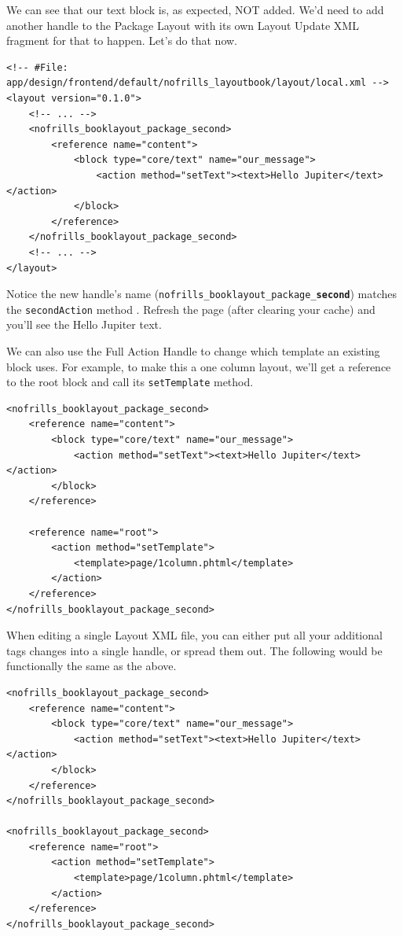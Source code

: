 \documentclass[oneside]{book}
\begin{document}
We can see that our text block is, as expected, NOT added.  We'd need to add another handle to the Package Layout with its own Layout Update XML fragment for that to happen. Let's do that now.

\begin{lstlisting}
<!-- #File: app/design/frontend/default/nofrills_layoutbook/layout/local.xml -->
<layout version="0.1.0">
    <!-- ... -->
    <nofrills_booklayout_package_second>
        <reference name="content">
            <block type="core/text" name="our_message">
                <action method="setText"><text>Hello Jupiter</text></action>
            </block>
        </reference>
    </nofrills_booklayout_package_second>
    <!-- ... -->
</layout>

\end{lstlisting}


Notice the new handle's name (\footnotesize\texttt{nofrills\_booklayout\_package\_\textbf{second}}\normalsize) matches the \footnotesize\texttt{secondAction} \normalsize  method .  Refresh the page (after clearing your cache) and you'll see the Hello Jupiter text.

We can also use the Full Action Handle to change which template an existing block uses.  For example, to make this a one column layout, we'll get a reference to the root block and call its \footnotesize\texttt{setTemplate} \normalsize  method.

\begin{lstlisting}
<nofrills_booklayout_package_second>
    <reference name="content">
        <block type="core/text" name="our_message">
            <action method="setText"><text>Hello Jupiter</text></action>
        </block>                        
    </reference>

    <reference name="root">
        <action method="setTemplate">
            <template>page/1column.phtml</template>
        </action>
    </reference>
</nofrills_booklayout_package_second>   

\end{lstlisting}


When editing a single Layout XML file, you can either put all your additional tags changes into a single handle, or spread them out. The following would be functionally the same as the above.

\begin{lstlisting}
<nofrills_booklayout_package_second>
    <reference name="content">
        <block type="core/text" name="our_message">
            <action method="setText"><text>Hello Jupiter</text></action>
        </block>                        
    </reference>
</nofrills_booklayout_package_second>   

<nofrills_booklayout_package_second>    
    <reference name="root">
        <action method="setTemplate">
            <template>page/1column.phtml</template>
        </action>
    </reference>
</nofrills_booklayout_package_second>

\end{lstlisting}
\end{document}
